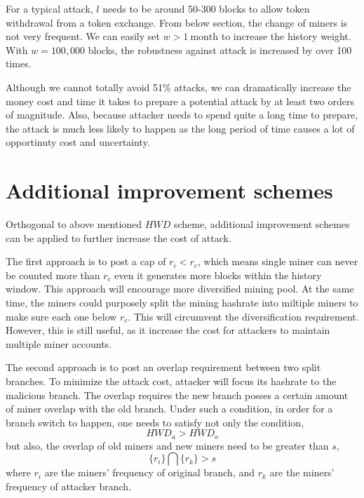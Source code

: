 \documentclass[conference]{IEEEtran}
\begin{document}
For a typical attack, $l$ needs to be around 50-300 blocks to allow token withdrawal from a token exchange. From below section, the change of miners is not very frequent. We can easily set $w > 1\ \text{month}$ to increase the history weight. With $w = 100,000$ blocks, the robustness against attack is increased by over 100 times. 

Although we cannot totally avoid 51\% attacks, we can dramatically increase the money cost and time it takes to prepare a potential attack by at least two orders of magnitude. Also, because attacker needs to spend quite a long time to prepare, the attack is much less likely to happen as the long period of time causes a lot of opportinuty cost and uncertainty.  


\section{Additional improvement schemes}

Orthogonal to above mentioned ${H\!W\!D}$ scheme, additional improvement schemes can be applied to further increase the cost of attack. 

The first approach is to post a cap of $r_i < r_c$, which means single miner can never be counted more than $r_c$ even it generates more blocks within the history window. This approach will encourage more diversified mining pool. At the same time, the miners could purposely split the mining hashrate into miltiple miners to make sure each one below $r_c$. This will circumvent the diversification requirement. However, this is still useful, as it increase the cost for attackers to maintain multiple miner accounts. 


The second approach is to post an overlap requirement between two split branches. To minimize the attack cost, attacker will focus its hashrate to the malicious branch. The overlap requires the new branch posses a certain amount of miner overlap with the old branch. Under such a condition, in order for a branch switch to happen, one needs to satisfy not only the  condition,
\begin{equation}
    H\!W\!D_a>H\!W\!D_o\label{eq_hwd_ineq}
\end{equation} 
but also, the overlap of old miners and new miners need to be greater than $s$,
\begin{equation}
    \{r_i\}\bigcap\{r_k\}>s\label{eq_overlap}
\end{equation}
where $r_i$ are the miners' frequency of original branch, and $r_k$ are the miners' frequency of attacker branch. 
\end{document}
